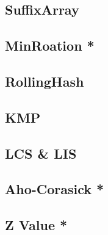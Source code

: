 \documentclass[a4paper,10pt,twocolumn,oneside]{article}
\begin{document}
\subsection{SuffixArray}


\subsection{MinRoation *}


\subsection{RollingHash}


\subsection{KMP}


\subsection{LCS \& LIS}


% 

% 

\subsection{Aho-Corasick *}


\subsection{Z Value *}


% 
\end{document}
